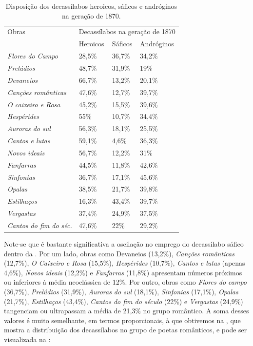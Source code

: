 \documentclass[portuguese]{textolivre}
\begin{document}
\begin{table}[htbp]
\centering
\begin{threeparttable}
\caption{Disposição dos decassílabos heroicos, sáficos e andróginos na geração de 1870.}
\label{tbl3}
\begin{tabular}{llll}
\toprule
Obras & \multicolumn{3}{l}{Decassílabos na geração de 1870} \\
& Heroicos & Sáficos & Andróginos \\
\midrule
\textit{Flores do Campo} &
28,5\% &
36,7\% &
34,2\% \\
\textit{Prelúdios} &
48,7\% &
31,9\% &
19\% \\
\textit{Devaneios} &
66,7\% &
13,2\% &
20,1\% \\
\textit{Canções românticas} &
47,6\% & 
12,7\% &
39,7\% \\
\textit{O caixeiro e Rosa} &
45,2\% &
15,5\% &
39,6\% \\
\textit{Hespérides} &
55\% &
10,7\% &
34,4\% \\
\textit{Auroras do sul} &
56,3\% &
18,1\% &
25,5\% \\
\textit{Cantos e lutas} &
59,1\% &
4,6\% &
36,3\% \\
\textit{Novos ideais} &
56,7\% & 
12,2\% &
31\% \\
\textit{Fanfarras} &
44,5\% &
11,8\% &
42,6\% \\
\textit{Sinfonias} &
36,7\% &
17,1\% &
45,6\% \\
\textit{Opalas} &
38,5\% &
21,7\% &
39,8\% \\
\textit{Estilhaços} &
16,3\% &
43,4\% &
39,7\% \\
\textit{Vergastas} &
37,4\% &
24,9\% &
37,5\% \\
\textit{Cantos do fim do séc.} &
47,6\% &
22\% &
29,2\% \\
\bottomrule
\end{tabular}
\end{threeparttable}
\end{table}

Note-se que é bastante significativa a oscilação no emprego do decassílabo sáfico dentro da . Por um lado, obras como Devaneios (13,2\%), \textit{Canções românticas} (12,7\%), \textit{O Caixeiro e Rosa} (15,5\%), \textit{Hespérides} (10,7\%), \textit{Cantos e lutas} (apenas 4,6\%), \textit{Novos ideais} (12,2\%) e \textit{Fanfarras} (11,8\%) apresentam números próximos ou inferiores à média neoclássica de 12\%. Por outro, obras como \textit{Flores do campo} (36,7\%), \textit{Prelúdios} (31,9\%), \textit{Auroras do sul} (18,1\%), \textit{Sinfonias} (17,1\%), \textit{Opalas} (21,7\%), \textit{Estilhaços} (43,4\%), \textit{Cantos do fim do século} (22\%) e \textit{Vergastas} (24,9\%) tangenciam ou ultrapassam a média de 21,3\% no grupo romântico. A soma desses valores é muito semelhante, em termos proporcionais, à que obtivemos na , que mostra a distribuição dos decassílabos no grupo de poetas românticos, e pode ser visualizada na :
\end{document}
